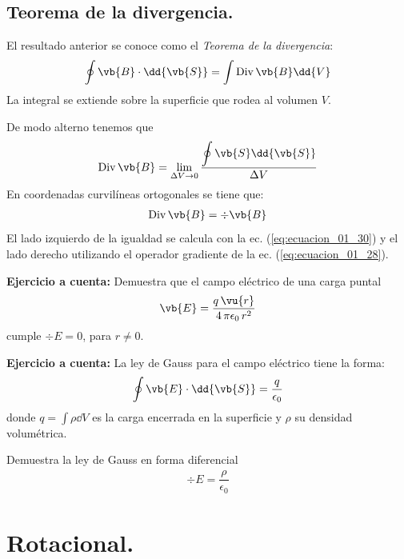 \subsection{Teorema de la divergencia.}
El resultado anterior se conoce como el \emph{Teorema de la divergencia}:
\begin{align}
\oint \vb{B} \cdot \dd{\vb{S}} = \int {\rm Div} \, \vb{B} \dd{V}
\label{eq:ecuacion_01_31}
\end{align}
La integral se extiende sobre la superficie que rodea al volumen $V$.
\par
De modo alterno tenemos que
\begin{align*}
{\rm Div} \, \vb{B} = \lim_{\Delta V \to 0} \dfrac{\displaystyle \oint \vb{S} \dd{\vb{S}}}{\Delta V}
\end{align*}
En coordenadas curvilíneas ortogonales se tiene que:
\begin{align*}
{\rm Div} \, \vb{B} = \div{\vb{B}}
\end{align*}
El lado izquierdo de la igualdad se calcula con la ec. (\ref{eq:ecuacion_01_30}) y el lado derecho utilizando el operador gradiente de la ec. (\ref{eq:ecuacion_01_28}).
\par
\textbf{Ejercicio a cuenta: } Demuestra que el campo eléctrico de una carga puntal
\begin{align*}
\vb{E} = \dfrac{q \, \vu{r}}{4 \, \pi \epsilon_{0} \, r^{2}}
\end{align*}
cumple $\div{E} = 0$, para $r \neq 0$.
\par
\textbf{Ejercicio a cuenta: } La ley de Gauss para el campo eléctrico tiene la forma:
\begin{align*}
\oint \vb{E} \cdot \dd{\vb{S}} = \dfrac{q}{\epsilon_{0}}
\end{align*}
donde $q = \displaystyle \int \rho \dd{V}$ es la carga encerrada en la superficie y $\rho$ su densidad volumétrica.
\par
Demuestra la ley de Gauss en forma diferencial
\begin{align*}
\div{E} = \dfrac{\rho}{\epsilon_{0}}
\end{align*}
\section{Rotacional.}
